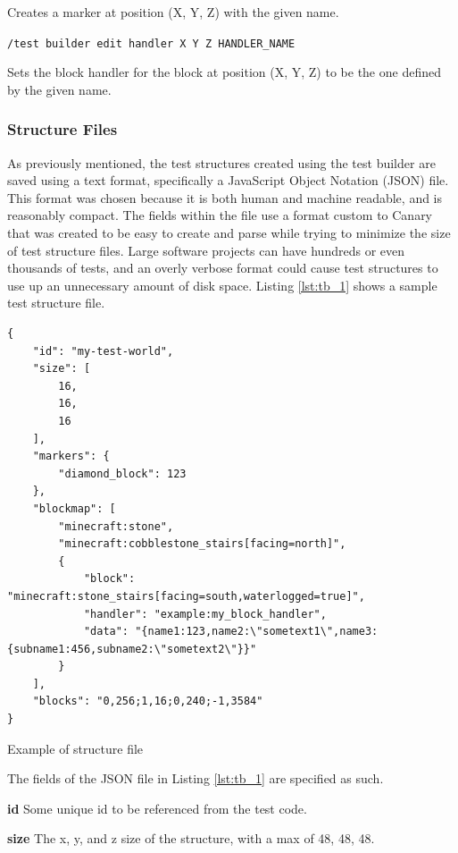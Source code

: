 \documentclass[12pt]{article}
\def\code#1{\texttt{#1}}
\newenvironment{longcode}{\captionsetup{type=listing}}{}
\begin{document}
\begin{onehalfspacing}
Creates a marker at position (X, Y, Z) with the given name.

\noindent\code{/test builder edit handler X Y Z HANDLER\_NAME}

Sets the block handler for the block at position (X, Y, Z) to be the one
defined by the given name.

\subsubsection{Structure Files}

As previously mentioned, the test structures created using the test
builder are saved using a text format, specifically a JavaScript Object
Notation (JSON) file. This format was chosen because it is both human
and machine readable, and is reasonably compact. The fields within the
file use a format custom to Canary that was created to be easy to create
and parse while trying to minimize the size of test structure files.
Large software projects can have hundreds or even thousands of tests,
and an overly verbose format could cause test structures to use up an
unnecessary amount of disk space. Listing \ref{lst:tb_1} shows a sample test
structure file.


\begin{longcode}
\begin{verbatim}
{
    "id": "my-test-world",
    "size": [
        16,
        16,
        16
    ],
    "markers": {
        "diamond_block": 123
    },
    "blockmap": [
        "minecraft:stone",
        "minecraft:cobblestone_stairs[facing=north]",
        {
            "block": "minecraft:stone_stairs[facing=south,waterlogged=true]",
            "handler": "example:my_block_handler",
            "data": "{name1:123,name2:\"sometext1\",name3:{subname1:456,subname2:\"sometext2\"}}"
        }
    ],
    "blocks": "0,256;1,16;0,240;-1,3584"
}
\end{verbatim}
  \caption{Example of structure file}
  \label{lst:tb_1}
\end{longcode}

The fields of the JSON file in Listing \ref{lst:tb_1} are specified as such.

\noindent\textbf{id}
Some unique id to be referenced from the test code.

\noindent\textbf{size}
The x, y, and z size of the structure, with a max of 48, 48, 48.


\end{onehalfspacing}
\end{document}
